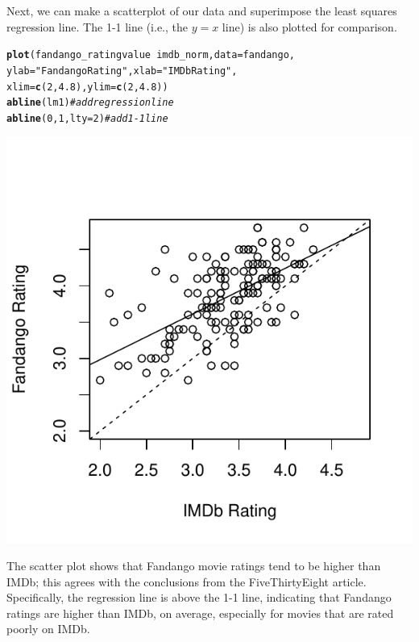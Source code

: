 \documentclass[11pt]{article}\usepackage[]{graphicx}\usepackage[]{color}
\makeatletter
\def\maxwidth{ %
  \ifdim\Gin@nat@width>\linewidth
    \linewidth
  \else
    \Gin@nat@width
  \fi
}
\newcommand{\hlnum}[1]{\textcolor[rgb]{0.686,0.059,0.569}{#1}}%
\newcommand{\hlstr}[1]{\textcolor[rgb]{0.192,0.494,0.8}{#1}}%
\newcommand{\hlcom}[1]{\textcolor[rgb]{0.678,0.584,0.686}{\textit{#1}}}%
\newcommand{\hlopt}[1]{\textcolor[rgb]{0,0,0}{#1}}%
\newcommand{\hlstd}[1]{\textcolor[rgb]{0.345,0.345,0.345}{#1}}%
\newcommand{\hlkwc}[1]{\textcolor[rgb]{0.333,0.667,0.333}{#1}}%
\newcommand{\hlkwd}[1]{\textcolor[rgb]{0.737,0.353,0.396}{\textbf{#1}}}%
\newenvironment{kframe}{%
 \def\at@end@of@kframe{}%
 \ifinner\ifhmode%
  \def\at@end@of@kframe{\end{minipage}}%
  \begin{minipage}{\columnwidth}%
 \fi\fi%
 \def\FrameCommand##1{\hskip\@totalleftmargin \hskip-\fboxsep
 \colorbox{shadecolor}{##1}\hskip-\fboxsep
     \hskip-\linewidth \hskip-\@totalleftmargin \hskip\columnwidth}%
 \MakeFramed {\advance\hsize-\width
   \@totalleftmargin\z@ \linewidth\hsize
   \@setminipage}}%
 {\par\unskip\endMakeFramed%
 \at@end@of@kframe}
\newenvironment{knitrout}{}{} %
\makeatother
\begin{document}
Next, we can make a scatterplot of our data and superimpose the least squares regression line.  The 1-1 line (i.e., the $y=x$ line) is also plotted for comparison.
\begin{knitrout}
\color{fgcolor}\begin{kframe}
\begin{alltt}
\hlkwd{plot}\hlstd{(fandango_ratingvalue} \hlopt{~} \hlstd{imdb_norm,} \hlkwc{data} \hlstd{= fandango,}
     \hlkwc{ylab} \hlstd{=} \hlstr{"Fandango Rating"}\hlstd{,} \hlkwc{xlab}\hlstd{=}\hlstr{"IMDb Rating"}\hlstd{,}
     \hlkwc{xlim}\hlstd{=}\hlkwd{c}\hlstd{(}\hlnum{2}\hlstd{,}\hlnum{4.8}\hlstd{),} \hlkwc{ylim} \hlstd{=} \hlkwd{c}\hlstd{(}\hlnum{2}\hlstd{,}\hlnum{4.8}\hlstd{))}
\hlkwd{abline}\hlstd{(lm1)} \hlcom{# add regression line}
\hlkwd{abline}\hlstd{(}\hlnum{0}\hlstd{,} \hlnum{1}\hlstd{,} \hlkwc{lty}\hlstd{=}\hlnum{2}\hlstd{)} \hlcom{# add 1-1 line}
\end{alltt}
\end{kframe}
\includegraphics[width=\maxwidth]{figure/unnamed-chunk-8-1} 

\end{knitrout}

The scatter plot shows that Fandango movie ratings tend to be higher than IMDb; this agrees with the conclusions from the FiveThirtyEight article.  Specifically, the regression line is above the 1-1 line, indicating that Fandango ratings are higher than IMDb, on average, especially for movies that are rated poorly on IMDb.
\end{document}
